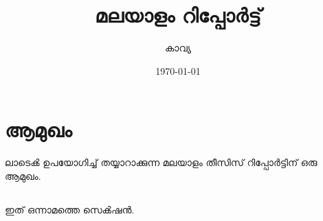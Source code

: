 \documentclass[12pt]{report}
\title{മലയാളം റിപ്പോർട്ട്}
\author{കാവ്യ}
\date{\today}
\begin{document}
\maketitle




\tableofcontents

\chapter{ആമുഖം}
ലാടെൿ ഉപയോഗിച്ച് തയ്യാറാക്കുന്ന മലയാളം തീസിസ് റിപ്പോർട്ടിന് ഒരു ആമുഖം.

\section{}

ഇത് ഒന്നാമത്തെ സെൿഷൻ.
\end{document}
